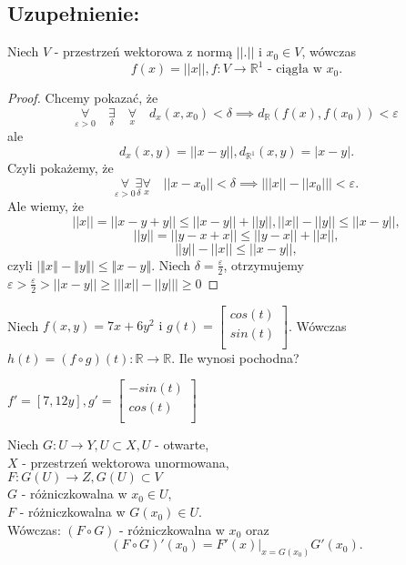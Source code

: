 \documentclass[../main.tex]{subfiles}
\begin{document}
\subsection{
    Uzupełnienie:
}

\begin{stw}
    Niech $V$ - przestrzeń wektorowa z normą $||.||$ i $x_0\in V$, wówczas
    \[
        f(x)=||x||, f: V\to\mathbb{R}^1 \text{ - ciągła w } x_0.
    \]
\end{stw}

\begin{proof}

Chcemy pokazać, że
    \[
        \underset{\varepsilon > 0}{\forall} \quad\underset{\delta}{\exists} \quad\underset{x}{\forall} \quad d_x (x,x_0) < \delta \implies d_{\mathbb{R}} (f(x),f(x_0)) < \varepsilon
    \]
ale
    \[
        d_x(x,y) = ||x-y||, d_{\mathbb{R}^1} (x,y) = |x-y|
    .\]
Czyli pokażemy, że
    \[
        \underset{\varepsilon > 0}{\forall} \underset{\delta}{\exists} \underset{x}{\forall} \quad ||x - x_0|| < \delta \implies \big | ||x|| - ||x_0|| \big | < \varepsilon
    .\]
Ale wiemy, że
    \[
        ||x|| = ||x-y+y|| \leq ||x-y|| + ||y||, ||x||-||y||\leq ||x-y||,
    \]
    \[
        ||y|| = ||y-x+x||\leq ||y-x|| + ||x||,
    \]
    \[
        ||y||-||x||\leq ||x-y||
    ,\]
czyli $\left| \left\Vert x \right\Vert  - \left\Vert y \right\Vert  \right| \leq \left\Vert x-y \right\Vert $. Niech $\delta = \frac{\varepsilon}{2}$, otrzymujemy $\varepsilon > \frac{\varepsilon}{2} > ||x-y|| \geq \big | ||x|| - ||y|| \big | \geq 0$

\end{proof}

\begin{pytanie}
Niech $f(x,y) = 7x+6y^2 \text{ i } g(t) = \left [ \begin{matrix}
cos(t) \\
sin(t) \\
\end{matrix}\right ]$. Wówczas $h(t) = (f \circ g)(t) : \mathbb{R}\to \mathbb{R}$. Ile wynosi pochodna?
\end{pytanie}

$f' = [7,12y] , g' = \left [ \begin{matrix}
-sin(t)\\
cos(t)\\
\end{matrix}\right ]$

\begin{tw}
Niech $G:U \to Y, U\subset X, U$ - otwarte, \\
    $X$ - przestrzeń wektorowa unormowana, \\
    $F: G(U) \to Z, G(U) \subset V$\\
    $G$ - różniczkowalna w $x_0\in U$,\\
    $F$ - różniczkowalna w $G(x_0)\in U$.\\
Wówczas:
        $(F \circ G )$ - różniczkowalna w $x_0$ oraz
    \[
        (F \circ G)' (x_0) = \left . F'(x)\right |_{x=G(x_0)} G'(x_0).
    \]
\end{tw}
\end{document}
